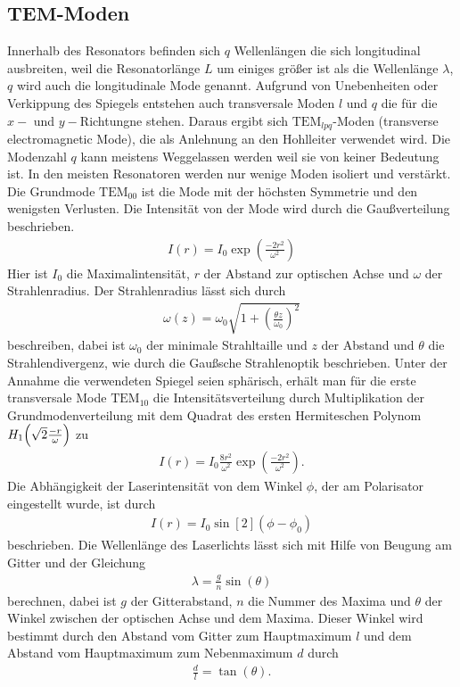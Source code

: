\subsection{$\mathbf{TEM}$-Moden}
Innerhalb des Resonators befinden sich $q$ Wellenlängen die sich longitudinal ausbreiten, weil die Resonatorlänge $L$ um einiges größer ist als die Wellenlänge $\lambda$, $q$ wird auch die longitudinale Mode genannt. Aufgrund von Unebenheiten oder Verkippung des Spiegels entstehen auch transversale Moden $l$ und $q$ die für die $x-$ und $y-$Richtungne stehen. Daraus ergibt sich $\mathrm{TEM}_{lpq}$-Moden (transverse electromagnetic Mode), die als Anlehnung an den Hohlleiter verwendet wird. Die Modenzahl $q$ kann meistens Weggelassen werden weil sie von keiner Bedeutung ist. In den meisten Resonatoren werden nur wenige Moden isoliert und verstärkt.\\
Die Grundmode $\mathrm{TEM}_{00}$ ist die Mode mit der höchsten Symmetrie und den wenigsten Verlusten. Die Intensität von der Mode wird durch die Gaußverteilung beschrieben.
\begin{align}
I(r)=I_0\exp\left(\frac{-2r^2}{\omega^2}\right)
\label{eq:tem00}
\end{align}
Hier ist $I_0$ die Maximalintensität, $r$ der Abstand zur optischen Achse und $\omega$ der Strahlenradius. Der Strahlenradius lässt sich durch
\begin{align}
\omega(z)=\omega_0 \sqrt{1+\left(\frac{\theta z}{\omega_0}\right)^2}
\end{align}
beschreiben, dabei ist $\omega_0$ der minimale Strahltaille und $z$ der Abstand und $\theta$ die Strahlendivergenz, wie durch die Gaußsche 
Strahlenoptik beschrieben.
Unter der Annahme die verwendeten Spiegel seien sphärisch, erhält man für die erste transversale Mode $\mathrm{TEM}_{10}$ 
die Intensitätsverteilung durch Multiplikation der Grundmodenverteilung mit dem Quadrat des ersten Hermiteschen Polynom\footnotemark $H_1\qty(\sqrt{2}\frac{-r}{\omega})$\cite{Demtroeder07}
zu
\begin{align}
I(r)=I_0\frac{8r^2}{\omega^2}\exp\left(\frac{-2r^2}{\omega^2}\right).
\label{eq:tem10}
\end{align}
Die Abhängigkeit der Laserintensität von dem Winkel $\phi$, der am Polarisator eingestellt wurde, ist durch
\begin{align}
I(r)=I_0\sin[2](\phi - \phi_0)
\label{eq:polarisation}
\end{align}
beschrieben. 
Die Wellenlänge des Laserlichts lässt sich mit Hilfe von Beugung am Gitter und der Gleichung
\begin{align}
\lambda=\frac{g}{n}\sin\left(  \theta \right)
\end{align}
berechnen, dabei ist $g$ der Gitterabstand, $n$ die Nummer des Maxima und $\theta$ der Winkel zwischen der optischen Achse und dem Maxima. Dieser Winkel wird bestimmt durch den Abstand vom Gitter zum Hauptmaximum $l$ und dem Abstand vom  Hauptmaximum zum Nebenmaximum $d$ durch
\begin{align*}
\frac{d}{l}=\tan\left( \theta \right).
\end{align*}


